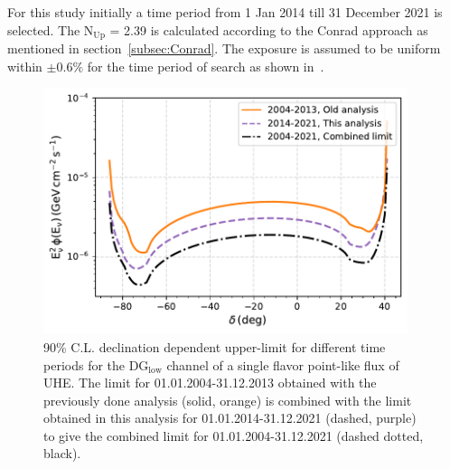 For this study initially a time period from 1 Jan 2014 till 31 December 2021 is selected. The N$_{\text{Up}}$ = 2.39 is calculated according to the Conrad approach as mentioned in section~\ref{subsec:Conrad}. The exposure is assumed to be uniform within $\pm 0.6\%$ for the time period of search as shown in~\cite{PierreAuger:2017pzq}. 

\begin{figure}[t!]
  \centering
  \includegraphics[width=0.95\textwidth]{thesis_figures/PointLimits/Point_comp_combined.pdf}
  \caption{90\% C.L. declination dependent upper-limit for different time periods for the DG$_{\text{low}}$ channel of a single flavor point-like flux of UHE. The limit for 01.01.2004-31.12.2013 obtained with the previously done analysis (solid, orange) is combined with the limit obtained in this analysis for 01.01.2014-31.12.2021 (dashed, purple) to give the combined limit for 01.01.2004-31.12.2021 (dashed dotted, black).}
  \label{fig:Dec_limit_comb1}
\end{figure}

